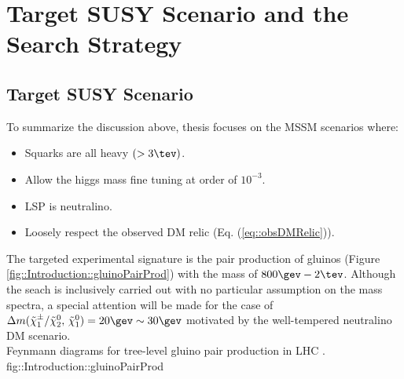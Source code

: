\clearpage
\section{Target SUSY Scenario and the Search Strategy} 
\subsection{Target SUSY Scenario}
To summarize the discussion above, 
thesis focuses on the MSSM scenarios where:
\begin{itemize}
 \item Squarks are all heavy $(>3\tev)$.
 \item Allow the higgs mass fine tuning at order of $10^{-3}$.
 \item LSP is neutralino.
 \item Loosely respect the observed DM relic (Eq. (\ref{eq::obsDMRelic})).
\end{itemize}

The targeted experimental signature is the pair production of gluinos (Figure \ref{fig::Introduction::gluinoPairProd}) with the mass of $800\gev-2\tev$. Although the seach is inclusively carried out with no particular assumption on the mass spectra, a special attention will be made for the case of $\dmcn = 20\gev \sim 30\gev$ motivated by the well-tempered neutralino DM scenario. \\


{Feynmann diagrams for tree-level gluino pair production in LHC \cite{gluinoSquarkLHC}.}
{fig::Introduction::gluinoPairProd}

\clearpage
